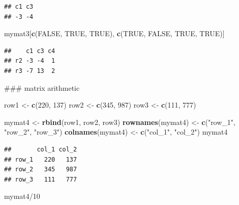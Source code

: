 \documentclass[]{book}
\newenvironment{Shaded}{\begin{snugshade}}{\end{snugshade}}
\newcommand{\KeywordTok}[1]{\textcolor[rgb]{0.13,0.29,0.53}{\textbf{{#1}}}}
\newcommand{\DecValTok}[1]{\textcolor[rgb]{0.00,0.00,0.81}{{#1}}}
\newcommand{\StringTok}[1]{\textcolor[rgb]{0.31,0.60,0.02}{{#1}}}
\newcommand{\OtherTok}[1]{\textcolor[rgb]{0.56,0.35,0.01}{{#1}}}
\newcommand{\NormalTok}[1]{{#1}}
\begin{document}
\begin{verbatim}
## c1 c3 
## -3 -4
\end{verbatim}

\begin{Shaded}
\begin{Highlighting}[]
\NormalTok{mymat3[}\KeywordTok{c}\NormalTok{(}\OtherTok{FALSE}\NormalTok{, }\OtherTok{TRUE}\NormalTok{, }\OtherTok{TRUE}\NormalTok{),}
       \KeywordTok{c}\NormalTok{(}\OtherTok{TRUE}\NormalTok{, }\OtherTok{FALSE}\NormalTok{, }\OtherTok{TRUE}\NormalTok{, }\OtherTok{TRUE}\NormalTok{)]}
\end{Highlighting}
\end{Shaded}

\begin{verbatim}
##    c1 c3 c4
## r2 -3 -4  1
## r3 -7 13  2
\end{verbatim}

\begin{Shaded}
\begin{Highlighting}[]
\NormalTok{### matrix arithmetic}

\NormalTok{row1 <-}\StringTok{ }\KeywordTok{c}\NormalTok{(}\DecValTok{220}\NormalTok{, }\DecValTok{137}\NormalTok{)}
\NormalTok{row2 <-}\StringTok{ }\KeywordTok{c}\NormalTok{(}\DecValTok{345}\NormalTok{, }\DecValTok{987}\NormalTok{)}
\NormalTok{row3 <-}\StringTok{ }\KeywordTok{c}\NormalTok{(}\DecValTok{111}\NormalTok{, }\DecValTok{777}\NormalTok{)}

\NormalTok{mymat4 <-}\StringTok{ }\KeywordTok{rbind}\NormalTok{(row1, row2, row3)}
\KeywordTok{rownames}\NormalTok{(mymat4) <-}\StringTok{ }\KeywordTok{c}\NormalTok{(}\StringTok{"row_1"}\NormalTok{, }\StringTok{"row_2"}\NormalTok{, }\StringTok{"row_3"}\NormalTok{)}
\KeywordTok{colnames}\NormalTok{(mymat4) <-}\StringTok{ }\KeywordTok{c}\NormalTok{(}\StringTok{"col_1"}\NormalTok{, }\StringTok{"col_2"}\NormalTok{)}
\NormalTok{mymat4}
\end{Highlighting}
\end{Shaded}

\begin{verbatim}
##       col_1 col_2
## row_1   220   137
## row_2   345   987
## row_3   111   777
\end{verbatim}

\begin{Shaded}
\begin{Highlighting}[]
\NormalTok{mymat4/}\DecValTok{10}
\end{Highlighting}
\end{Shaded}
\end{document}
